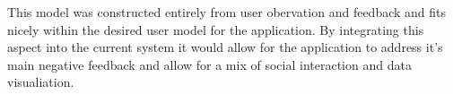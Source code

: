 This model was constructed entirely from user obervation and feedback and fits nicely within the desired user model for the application. By integrating this aspect into the current system it would allow for the application to address it's main negative feedback and allow for a mix of social interaction and data visualiation.
